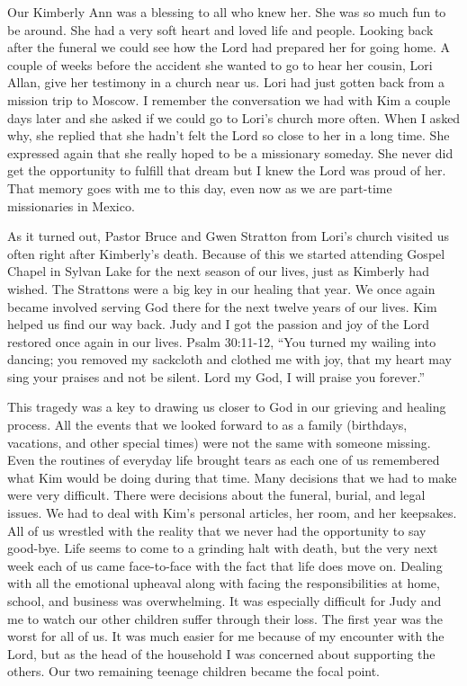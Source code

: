 \documentclass[oneside]{book}
\begin{document}
Our Kimberly Ann was a blessing to all who knew her. She was so much fun to be around. She had a very soft heart and loved life and people. Looking back after the funeral we could see how the Lord had prepared her for going home. A couple of weeks before the accident she wanted to go to hear her cousin, Lori Allan, give her testimony in a church near us. Lori had just gotten back from a mission trip to Moscow. I remember the conversation we had with Kim a couple days later and she asked if we could go to Lori's church more often. When I asked why, she replied that she hadn't felt the Lord so close to her in a long time. She expressed again that she really hoped to be a missionary someday. She never did get the opportunity to fulfill that dream but I knew the Lord was proud of her. That memory goes with me to this day, even now as we are part-time missionaries in Mexico.

As it turned out, Pastor Bruce and Gwen Stratton from Lori's church visited us often right after Kimberly’s death. Because of this we started attending Gospel Chapel in Sylvan Lake for the next season of our lives, just as Kimberly had wished. The Strattons were a big key in our healing that year. We once again became involved serving God there for the next twelve years of our lives. Kim helped us find our way back. Judy and I got the passion and joy of the Lord restored once again in our lives. Psalm 30:11-12, “You turned my wailing into dancing; you removed my sackcloth and clothed me with joy, that my heart may sing your praises and not be silent. Lord my God, I will praise you forever.”

This tragedy was a key to drawing us closer to God in our grieving and healing process. All the events that we looked forward to as a family (birthdays, vacations, and other special times)  were not the same with someone missing. Even the routines of everyday life brought tears as each one of us remembered what Kim would be doing during that time. Many decisions that we had to make were very difficult. There were decisions about the funeral, burial, and legal issues. We had to deal with Kim's personal articles, her room, and her keepsakes. All of us wrestled with the reality that we never had the opportunity to say good-bye. Life seems to come to a grinding halt with death, but the very next week each of us came face-to-face with the fact that life does move on. Dealing with all the emotional upheaval along with facing the responsibilities at home, school, and business was overwhelming. It was especially difficult for Judy and me to watch our other children suffer through their loss. The first year was the worst for all of us. It was much easier for me because of my encounter with the Lord, but as the head of the household I was concerned about supporting the others. Our two remaining teenage children became the focal point.
\end{document}
